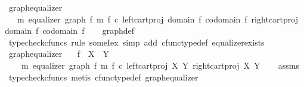 \begin{isabellebody}
\isanewline
{}\isamarkupfalse%
\ graph{\isacharunderscore}{\kern0pt}equalizer{\isacharcolon}{\kern0pt}\isanewline
\ \ {\isachardoublequoteopen}{\isasymexists}\ m{\isachardot}{\kern0pt}\ equalizer\ {\isacharparenleft}{\kern0pt}graph\ f{\isacharparenright}{\kern0pt}\ m\ {\isacharparenleft}{\kern0pt}f\ {\isasymcirc}\isactrlsub c\ left{\isacharunderscore}{\kern0pt}cart{\isacharunderscore}{\kern0pt}proj\ {\isacharparenleft}{\kern0pt}domain\ f{\isacharparenright}{\kern0pt}\ {\isacharparenleft}{\kern0pt}codomain\ f{\isacharparenright}{\kern0pt}{\isacharparenright}{\kern0pt}\ {\isacharparenleft}{\kern0pt}right{\isacharunderscore}{\kern0pt}cart{\isacharunderscore}{\kern0pt}proj\ {\isacharparenleft}{\kern0pt}domain\ f{\isacharparenright}{\kern0pt}\ {\isacharparenleft}{\kern0pt}codomain\ f{\isacharparenright}{\kern0pt}{\isacharparenright}{\kern0pt}{\isachardoublequoteclose}\isanewline
%
\isadelimproof
\ \ %
\endisadelimproof
%
\isatagproof
{}\isamarkupfalse%
\ graph{\isacharunderscore}{\kern0pt}def\isanewline
\ \ \isamarkupfalse%
\ {\isacharparenleft}{\kern0pt}typecheck{\isacharunderscore}{\kern0pt}cfuncs{\isacharcomma}{\kern0pt}\ rule\ someI{\isacharunderscore}{\kern0pt}ex{\isacharcomma}{\kern0pt}\ simp\ add{\isacharcolon}{\kern0pt}\ cfunc{\isacharunderscore}{\kern0pt}type{\isacharunderscore}{\kern0pt}def\ equalizer{\isacharunderscore}{\kern0pt}exists{\isacharparenright}{\kern0pt}%
\endisatagproof
{\isafoldproof}%
%
\isadelimproof
\isanewline
%
\endisadelimproof
\ \ \isanewline
{}\isamarkupfalse%
\ graph{\isacharunderscore}{\kern0pt}equalizer{}{\isacharcolon}{\kern0pt}\isanewline
\ \ \ {\isachardoublequoteopen}f\ {\isacharcolon}{\kern0pt}\ X\ {\isasymrightarrow}\ Y{\isachardoublequoteclose}\isanewline
\ \ \ {\isachardoublequoteopen}{\isasymexists}\ m{\isachardot}{\kern0pt}\ equalizer\ {\isacharparenleft}{\kern0pt}graph\ f{\isacharparenright}{\kern0pt}\ m\ {\isacharparenleft}{\kern0pt}f\ {\isasymcirc}\isactrlsub c\ left{\isacharunderscore}{\kern0pt}cart{\isacharunderscore}{\kern0pt}proj\ X\ Y{\isacharparenright}{\kern0pt}\ {\isacharparenleft}{\kern0pt}right{\isacharunderscore}{\kern0pt}cart{\isacharunderscore}{\kern0pt}proj\ X\ Y{\isacharparenright}{\kern0pt}{\isachardoublequoteclose}\isanewline
%
\isadelimproof
\ \ %
\endisadelimproof
%
\isatagproof
{}\isamarkupfalse%
\ assms\ \isamarkupfalse%
\ {\isacharparenleft}{\kern0pt}typecheck{\isacharunderscore}{\kern0pt}cfuncs{\isacharcomma}{\kern0pt}\ metis\ cfunc{\isacharunderscore}{\kern0pt}type{\isacharunderscore}{\kern0pt}def\ graph{\isacharunderscore}{\kern0pt}equalizer{\isacharparenright}{\kern0pt}%

\end{isabellebody}
